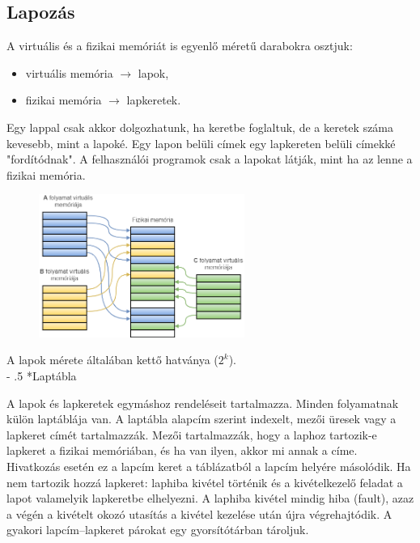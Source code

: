 \documentclass[tikz,12pt,margin=0px]{article}
\makeatletter
\renewcommand\paragraph{%
	\@startsection{paragraph}{4}{0mm}%
	{-\baselineskip}%
	{.5\baselineskip}%
	{\normalfont\normalsize\bfseries}}
\makeatother
\begin{document}
	\subsection*{Lapozás}
	
    A virtuális és a fizikai memóriát is egyenlő méretű darabokra osztjuk:
    \begin{itemize}[topsep=8pt,itemsep=4pt,partopsep=4pt, parsep=4pt]
        \item virtuális memória $\rightarrow$ lapok,
        \item fizikai memória $\rightarrow$ lapkeretek.
    \end{itemize}

    \noindent Egy lappal csak akkor dolgozhatunk, ha keretbe foglaltuk, de a keretek száma kevesebb, mint a lapoké. Egy lapon belüli címek egy lapkereten belüli címekké "fordítódnak". A felhasználói programok csak a lapokat látják, mint ha az lenne a fizikai memória.\\

    \begin{figure}[H]
        \centering
        \includegraphics[width=0.6\textwidth]{img/paging.png}
        \caption{}
        \label{paging}
    \end{figure}

    \noindent A lapok mérete általában kettő hatványa ($2^k$).\\

    \paragraph*{Laptábla}

    \noindent A lapok és lapkeretek egymáshoz rendeléseit tartalmazza. Minden folyamatnak külön laptáblája van. A laptábla alapcím szerint indexelt, mezői üresek vagy a lapkeret címét tartalmazzák. Mezői tartalmazzák, hogy a laphoz tartozik-e lapkeret a fizikai memóriában, és ha van ilyen, akkor mi annak a címe. Hivatkozás esetén ez a lapcím keret a táblázatból a lapcím helyére másolódik. Ha nem tartozik hozzá lapkeret: laphiba kivétel történik és a kivételkezelő feladat a lapot valamelyik lapkeretbe elhelyezni. A laphiba kivétel mindig hiba (fault), azaz a végén a kivételt okozó utasítás a kivétel kezelése után újra végrehajtódik. A gyakori lapcím–lapkeret párokat egy gyorsítótárban tároljuk.
\end{document}
